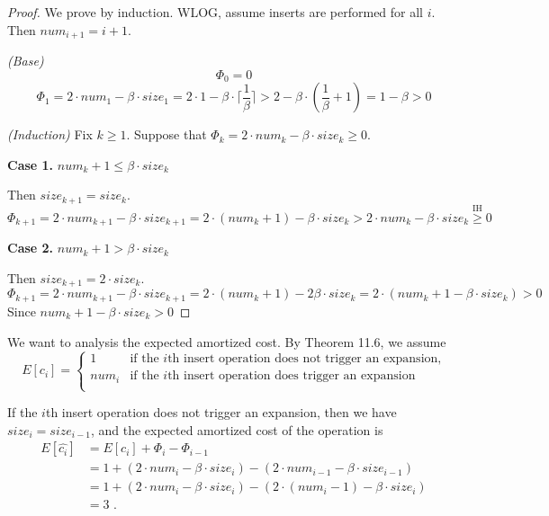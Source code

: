 \begin{proof}
    We prove by induction.
    WLOG, assume inserts are performed for all $i$.
    Then $num_{i+1} = i + 1$.

    \textit{(Base)}
    \begin{equation*}
        \Phi_0 = 0
    \end{equation*}
    \begin{equation*}
        \Phi_1 = 2 \cdot num_1 - \beta \cdot size_1
        = 2 \cdot 1 - \beta \cdot \lceil \frac{1}{\beta} \rceil
        > 2 - \beta \cdot (\frac{1}{\beta} + 1)
        = 1 - \beta > 0
    \end{equation*}

    \textit{(Induction)}
    Fix $k \geq 1$.
    Suppose that $\Phi_k = 2 \cdot num_k - \beta \cdot size_k \geq 0$.
    
    \textbf{Case 1.}
    $num_k + 1 \leq \beta \cdot size_k$

    Then $size_{k+1} = size_k$.
    \begin{equation*}
        \Phi_{k+1} = 2 \cdot num_{k+1} - \beta \cdot size_{k+1} 
        = 2 \cdot (num_k + 1) - \beta \cdot size_k 
        > 2 \cdot num_k - \beta \cdot size_k \overset{\text{IH}}{\geq} 0
    \end{equation*}
    
    \textbf{Case 2.}
    $num_k + 1 > \beta \cdot size_k$
    
    Then $size_{k+1} = 2 \cdot size_k$.
    \begin{equation*}
        \Phi_{k+1} = 2 \cdot num_{k+1} - \beta \cdot size_{k+1} 
        = 2 \cdot (num_k + 1) - 2 \beta \cdot size_k
        = 2 \cdot (num_k + 1 - \beta \cdot size_k)
        > 0
    \end{equation*}
    Since $num_k + 1 - \beta \cdot size_k > 0$
\end{proof}

We want to analysis the expected amortized cost.
By Theorem 11.6,
we assume
\begin{equation*}
    E[c_i] = 
    \begin{cases}
        1 & \text{if the $i$th insert operation does not trigger an expansion,} \\
        num_i & \text{if the $i$th insert operation does trigger an expansion} \\
    \end{cases}
\end{equation*}

If the $i$th insert operation does not trigger an expansion,
then we have $size_i = size_{i-1}$, and 
the expected amortized cost of the operation is
\begin{equation*}
\begin{split}
    E[\hat{c_i}] & = E[c_i] + \Phi_i - \Phi_{i-1} \\
    & = 1 + (2 \cdot num_i - \beta \cdot size_i) - (2 \cdot num_{i-1} - \beta \cdot size_{i-1}) \\
    & = 1 + (2 \cdot num_i - \beta \cdot size_i) - (2 \cdot (num_i - 1) - \beta \cdot size_i) \\
    & = 3 \text{ .} 
\end{split}
\end{equation*}

